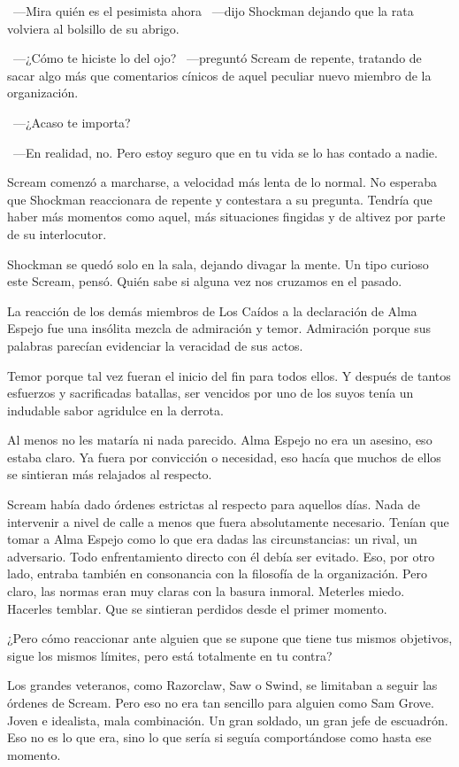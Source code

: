 ~---Mira quién es el pesimista ahora ~---dijo Shockman dejando que la rata volviera al bolsillo de su abrigo.

~---¿Cómo te hiciste lo del ojo? ~---preguntó Scream de repente, tratando de sacar algo más que comentarios cínicos de aquel peculiar nuevo miembro de la organización.

~---¿Acaso te importa?

~---En realidad, no. Pero estoy seguro que en tu vida se lo has contado a nadie.

Scream comenzó a marcharse, a velocidad más lenta de lo normal. No esperaba que Shockman reaccionara de repente y contestara a su pregunta. Tendría que haber más momentos como aquel, más situaciones fingidas y de altivez por parte de su interlocutor.

Shockman se quedó solo en la sala, dejando divagar la mente. Un tipo curioso este Scream, pensó. Quién sabe si alguna vez nos cruzamos en el pasado.

\parbreak
La reacción de los demás miembros de Los Caídos a la declaración de Alma Espejo fue una insólita mezcla de admiración y temor. Admiración porque sus palabras parecían evidenciar la veracidad de sus actos.

Temor porque tal vez fueran el inicio del fin para todos ellos. Y después de tantos esfuerzos y sacrificadas batallas, ser vencidos por uno de los suyos tenía un indudable sabor agridulce en la derrota.

Al menos no les mataría ni nada parecido. Alma Espejo no era un asesino, eso estaba claro. Ya fuera por convicción o necesidad, eso hacía que muchos de ellos se sintieran más relajados al respecto.

Scream había dado órdenes estrictas al respecto para aquellos días. Nada de intervenir a nivel de calle a menos que fuera absolutamente necesario. Tenían que tomar a Alma Espejo como lo que era dadas las circunstancias: un rival, un adversario. Todo enfrentamiento directo con él debía ser evitado. Eso, por otro lado, entraba también en consonancia con la filosofía de la organización. Pero claro, las normas eran muy claras con la basura inmoral. Meterles miedo. Hacerles temblar. Que se sintieran perdidos desde el primer momento.

¿Pero cómo reaccionar ante alguien que se supone que tiene tus mismos objetivos, sigue los mismos límites, pero está totalmente en tu contra?

Los grandes veteranos, como Razorclaw, Saw o Swind, se limitaban a seguir las órdenes de Scream. Pero eso no era tan sencillo para alguien como Sam Grove. Joven e idealista, mala combinación. Un gran soldado, un gran jefe de escuadrón. Eso no es lo que era, sino lo que sería si seguía comportándose como hasta ese momento.

